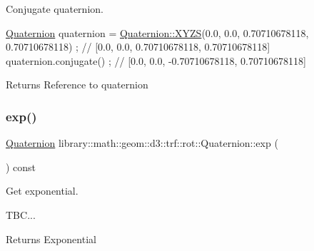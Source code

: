 Conjugate quaternion. 


\begin{DoxyCode}
\hyperlink{classlibrary_1_1math_1_1geom_1_1d3_1_1trf_1_1rot_1_1_quaternion_a1b8794cce68c5ee86dd50f9ba53635fa}{Quaternion} quaternion = \hyperlink{classlibrary_1_1math_1_1geom_1_1d3_1_1trf_1_1rot_1_1_quaternion_a006294eb483bcfc352c2dc36cf19ceec}{Quaternion::XYZS}(0.0, 0.0, 0.70710678118, 0.70710678118) 
      ; \textcolor{comment}{// [0.0, 0.0, 0.70710678118, 0.70710678118]}
quaternion.conjugate() ; \textcolor{comment}{// [0.0, 0.0, -0.70710678118, 0.70710678118]}
\end{DoxyCode}


\begin{DoxyReturn}{Returns}
Reference to quaternion 
\end{DoxyReturn}
\mbox{\label{classlibrary_1_1math_1_1geom_1_1d3_1_1trf_1_1rot_1_1_quaternion_a6a5dda4ec1d00646bdda2bb9b00bc94c}} 
\subsubsection{\texorpdfstring{exp()}{exp()}}
{\footnotesize\ttfamily \hyperlink{classlibrary_1_1math_1_1geom_1_1d3_1_1trf_1_1rot_1_1_quaternion}{Quaternion} library\+::math\+::geom\+::d3\+::trf\+::rot\+::\+Quaternion\+::exp (\begin{DoxyParamCaption}{ }\end{DoxyParamCaption}) const}



Get exponential. 


\begin{DoxyCode}
TBC...
\end{DoxyCode}


\begin{DoxyReturn}{Returns}
Exponential 
\end{DoxyReturn}
\mbox{\label{classlibrary_1_1math_1_1geom_1_1d3_1_1trf_1_1rot_1_1_quaternion_a12376aa1c1f32800a14dc1939316a5ec}} 
